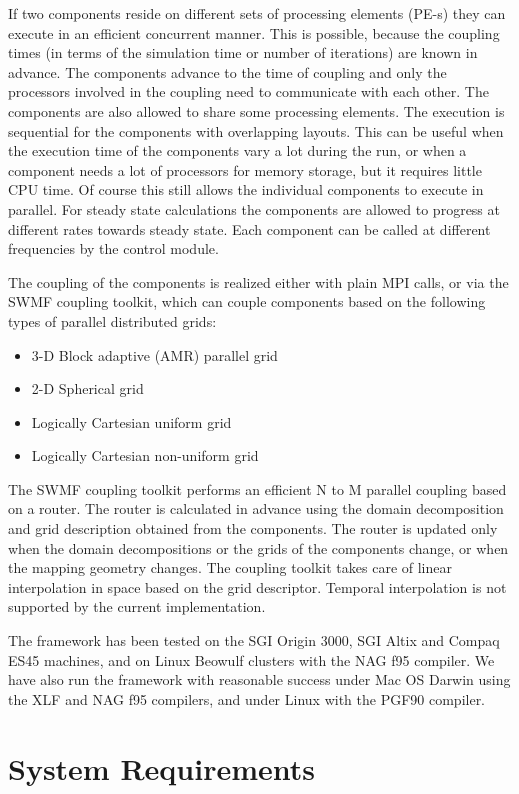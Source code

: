 If two components reside on different sets of processing elements
(PE-s) they can execute in an efficient concurrent manner.
This is possible, because the coupling times (in terms of the simulation time
or number of iterations) are known in advance.  
The components advance to the time of coupling and
only the processors involved in the coupling need to communicate with
each other. The components are also allowed to share some processing elements.
The execution is sequential for the components with overlapping layouts.
This can be useful when the execution time of the components vary a lot
during the run, or when a component needs a lot of processors 
for memory storage, but it requires little CPU time.
Of course this still allows the individual components to execute in parallel.
For steady state calculations the components are allowed to progress
at different rates towards steady state. Each component can be called
at different frequencies by the control module.

The coupling of the components is realized either with plain MPI
calls, or via the SWMF coupling toolkit, which can couple components
based on the following types of parallel distributed grids:
\begin{itemize}
\item 3-D Block adaptive (AMR) parallel grid
\item 2-D Spherical grid
\item Logically Cartesian uniform grid
\item Logically Cartesian non-uniform grid 
\end{itemize}
The SWMF coupling toolkit performs an efficient N to M parallel
coupling based on a router. The router is calculated in advance using
the domain decomposition and grid description obtained from the
components.  The router is updated only when the domain decompositions
or the grids of the components change, or when the mapping geometry
changes.  The coupling toolkit takes care of linear interpolation in
space based on the grid descriptor.  Temporal interpolation is not
supported by the current implementation.

The framework has been tested on the SGI Origin 3000, SGI Altix and 
Compaq ES45 machines, and on Linux Beowulf clusters with the NAG f95 
compiler. We have also run the framework with reasonable success under
Mac OS Darwin using the XLF and NAG f95 compilers, and under Linux with
the PGF90 compiler.

\section{System Requirements}

